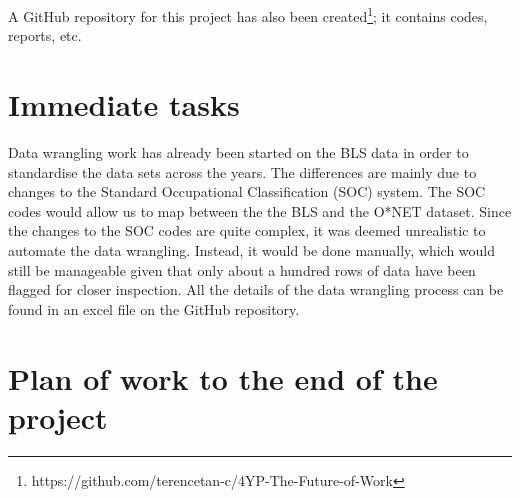 \documentclass[11pt]{article}
\begin{document}
A GitHub repository for this project has also been created\footnote{https://github.com/terencetan-c/4YP-The-Future-of-Work}; it contains codes, reports, etc.


  
    
  \section{Immediate tasks}
  Data wrangling work has already been started on the BLS data in order to standardise the data sets across the years. The differences are mainly due to changes to the Standard Occupational Classification (SOC) system. The SOC codes would allow us to map between the the BLS and the O*NET dataset. Since the changes to the SOC codes are quite complex, it was deemed unrealistic to automate the data wrangling. Instead, it would be done manually, which would still be manageable given that only about a hundred rows of data have been flagged for closer inspection. All the details of the data wrangling process can be found in an excel file on the GitHub repository.

  \section{Plan of work to the end of the project}
  
    \printbibliography[heading=bibintoc]
\end{document}
